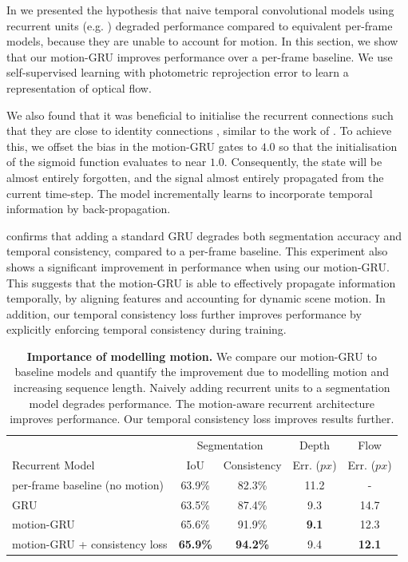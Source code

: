 In  we presented the hypothesis that naive temporal convolutional models using recurrent units (e.g. \cite{patraucean2015spatio,valipour2017recurrent}) degraded performance compared to equivalent per-frame models, because they are unable to account for motion. In this section, we show that our motion-GRU improves performance over a per-frame baseline. We use self-supervised learning with photometric reprojection error to learn a representation of optical flow.

We also found that it was beneficial to initialise the recurrent connections such that they are close to identity connections \cite{he2016deep}, similar to the work of \cite{gadde2017semantic}. To achieve this, we offset the bias in the motion-GRU gates to $4.0$ so that the initialisation of the sigmoid function evaluates to near $1.0$. Consequently, the state will be almost entirely forgotten, and the signal almost entirely propagated from the current time-step. The model incrementally learns to incorporate temporal information by back-propagation.

 confirms that adding a standard GRU degrades both segmentation accuracy and temporal consistency, compared to a per-frame baseline. This experiment also shows a significant improvement in performance when using our motion-GRU. This suggests that the motion-GRU is able to effectively propagate information temporally, by aligning features and accounting for dynamic scene motion.
In addition, our temporal consistency loss further improves performance by explicitly enforcing temporal consistency during training.

\begin{table}[t]
\begin{center}
	\begin{tabular}{l|c|c|c|c}
    \hline
    & \multicolumn{2}{c|}{Segmentation} & Depth & Flow \\
    Recurrent Model & IoU & Consistency & Err. ($px$) & Err. ($px$) \\
    \hline\hline
    per-frame baseline (no motion) & 63.9\% & 82.3\% & 11.2 & - \\
    GRU & 63.5\% & 87.4\% & 9.3 & 14.7 \\
    motion-GRU & 65.6\% & 91.9\% & \textbf{9.1} & 12.3 \\
    motion-GRU + consistency loss & \textbf{65.9\%} & \textbf{94.2\%} & 9.4 & \textbf{12.1} \\
    \hline
	\end{tabular}
\end{center}
\vspace{-2mm}
\caption[Importance of modelling motion.]{\textbf{Importance of modelling motion.} We compare our motion-GRU to baseline models and quantify the improvement due to modelling motion and increasing sequence length. Naively adding recurrent units to a segmentation model degrades performance. The motion-aware recurrent architecture improves performance. Our temporal consistency loss improves results further.}
\label{tbl:motion}
\vspace{-5mm}
\end{table}

